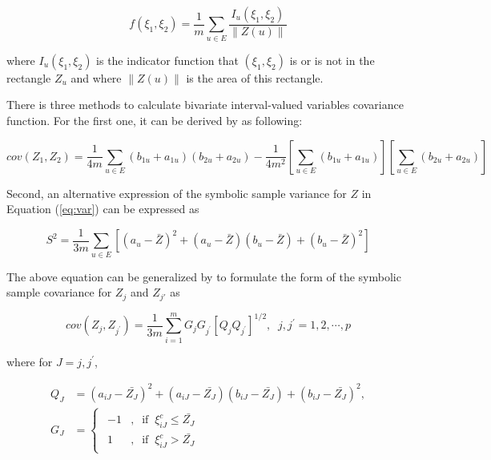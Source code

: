 \documentclass[article]{jss}
\begin{document}
\begin{equation}\label{eq:bi_density}
f(\xi_1,\xi_2)=\frac{1}{m}\sum_{u \in E}\frac{I_u(\xi_1,\xi_2)}{\| Z(u) \|}
\end{equation}

where $I_u(\xi_1,\xi_2)$ is the indicator function that $(\xi_1,\xi_2)$ is or is not in the rectangle $Z_u$ and where $\|Z(u)\|$ is the area of this rectangle.

There is three methods to calculate bivariate interval-valued variables covariance function. For the first one, it can be derived by \cite{billard:2003} as following:

\begin{equation}\label{eq:cov}
cov(Z_1,Z_2)=\frac{1}{4m}\sum_{u \in E}(b_{1u} + a_{1u})(b_{2u} + a_{2u})-\frac{1}{4m^2}\left[ \sum_{u \in E}(b_{1u} + a_{1u}) \right]\left[ \sum_{u \in E}(b_{2u} + a_{2u}) \right]
\end{equation}

Second, an alternative expression of the symbolic sample variance for $Z$ in Equation (\ref{eq:var}) can be expressed as

\[
S^2 = \frac{1}{3m}\sum_{u \in E}\left[  (a_u-\bar{Z})^2 +(a_u-\bar{Z})(b_u-\bar{Z})+(b_u-\bar{Z})^2 \right]
\]

The above equation can be generalized by \cite{Billard+Diday:2007} to formulate the form of the symbolic sample covariance for $Z_j$ and $Z_{j\prime}$ as

\begin{equation}\label{eq:gq_cov}
cov(Z_j,Z_{j^{ \prime}}) = \frac{1}{3m}\sum_{i=1}^{m}G_jG_{j^{\prime}}\left[ Q_jQ_{j^\prime} \right]^{1/2}, \;\;j,j^\prime=1,2,\cdots,p
\end{equation}

where for $J = j,j^\prime$, 

\[
\begin{split}
Q_J &= (a_{iJ} - \bar{Z_J})^2 +(a_{iJ} - \bar{Z_J})(b_{iJ} - \bar{Z_J})+(b_{iJ} - \bar{Z_J})^2,\\
G_J &= \left\{\begin{array}{l}
          \begin{split}
          -1 &, \;\;\mbox{if} \;\; \xi_{iJ}^{c} \leq \bar{Z_J}\\
           1 &,  \;\;\mbox{if} \;\;  \xi_{iJ}^{c} > \bar{Z_J}
           \end{split}
        \end{array}\right.
\end{split}
\]
\end{document}
